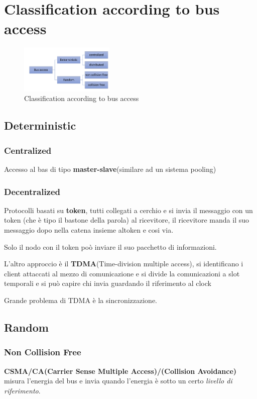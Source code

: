 \section{Classification according to bus access}

\begin{figure}[!ht]
  \centering
  \includegraphics[width=0.4\textwidth]{./images/classification_bus_access.png}
  \caption{Classification according to bus access}
  \label{fig:classification_bus_access}
\end{figure}

\subsection{Deterministic}
\subsubsection{Centralized}
Accesso al bas di tipo \textbf{master-slave}(similare ad un sistema pooling)
\subsubsection{Decentralized}

Protocolli basati su \textbf{token}, tutti collegati a cerchio e si invia il messaggio con un token (che è tipo il bastone della parola) al ricevitore, il ricevitore manda il suo messaggio dopo nella catena insieme altoken e cosi via.

Solo il nodo con il token poò inviare il suo pacchetto di informazioni.


L'altro approccio è il \textbf{TDMA}(Time-division multiple access), si identificano i client attaccati al mezzo di comunicazione e si divide la comunicazioni a slot temporali e si può capire chi invia guardando il riferimento al clock

Grande problema di TDMA è la sincronizzazione.


\subsection{Random}
\subsubsection{Non Collision Free}
\textbf{CSMA/CA(Carrier Sense Multiple Access)/(Collision Avoidance)} misura l'energia del bus e invia quando l'energia è sotto un certo \textit{livello di riferimento}.

